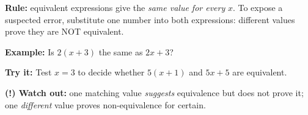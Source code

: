 \documentclass[12pt]{article}
\begin{document}

\begin{formulabox}
\textbf{Rule:} equivalent expressions give the \emph{same value for every} $x$.
To expose a suspected error, substitute one number into both expressions:
different values prove they are NOT equivalent.
\end{formulabox}

\begin{examplebox}
\textbf{Example:} \quad Is $2(x + 3)$ the same as $2x + 3$?
\end{examplebox}

\begin{tryitbox}
\textbf{Try it:} \quad Test $x = 3$ to decide whether $5(x + 1)$ and $5x + 5$ are
equivalent.\\[2pt]
\end{tryitbox}

\begin{watchoutbox}
\textbf{(!) Watch out:} one matching value \emph{suggests} equivalence but does not
prove it; one \emph{different} value proves non-equivalence for certain.
\end{watchoutbox}
\end{document}
